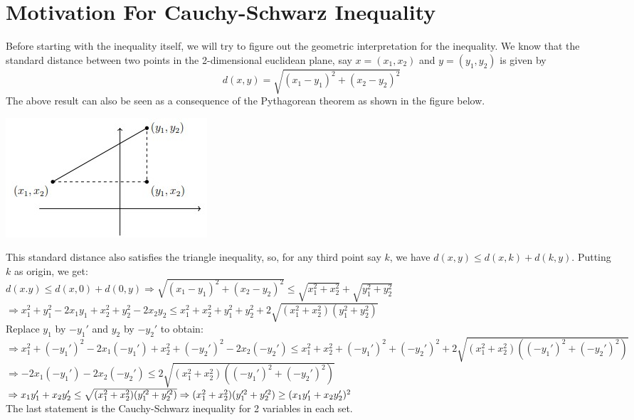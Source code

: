 \documentclass[12pt]{article}
\begin{document}
\section{Motivation For Cauchy-Schwarz Inequality}
Before starting with the inequality itself, we will try to figure out the geometric interpretation for the inequality. We know that the standard distance between two points in the 2-dimensional euclidean plane, say $x=(x_1,x_2)$ and $y=(y_1,y_2)$ is given by $$ d(x ,y)=\sqrt{(x_1-y_1)^2+(x_2-y_2)^2}$$
The above result can also be seen as a consequence of the Pythagorean theorem as shown in the figure below.
\begin{center}
    \includegraphics[]{images/zpc.jpg}
\end{center}
This standard distance also satisfies the triangle inequality, so, for any third point say $k$, we have $d(x,y)\leq d(x,k)+d(k,y)$. Putting $k$ as origin, we get: \\
$d(x.y)\leq d(x,0)+d(0,y)\Rightarrow \sqrt{(x_1-y_1)^2+(x_2-y_2)^2}\leq \sqrt{x_1^2+x_2^2}+\sqrt{y_1^2+y_2^2}$\\
$\Rightarrow x_1^2+y_1^2-2x_1y_1+x_2^2+y_2^2-2x_2y_2\leq x_1^2+x_2^2+y_1^2+y_2^2+2\sqrt{(x_1^2+x_2^2)(y_1^2+y_2^2)}$\\
Replace $y_1$ by $-y_1'$ and $y_2$ by $-y_2'$ to obtain:\\
$ \Rightarrow x_1^2+(-y_1')^2-2x_1(-y_1')+x_2^2+(-y_2')^2-2x_2(-y_2')\leq x_1^2+x_2^2+(-y_1')^2+(-y_2')^2+2\sqrt{(x_1^2+x_2^2)((-y_1')^2+(-y_2')^2)} $\\
$ \Rightarrow -2x_1(-y_1')-2x_2(-y_2')\leq 2\sqrt{(x_1^2+x_2^2)((-y_1')^2+(-y_2')^2)} $\\
$ \Rightarrow x_1y_1'+x_2y_2'\leq \sqrt{(x_1^2+x_2^2)(y_1'^2+y_2'^2)} \\ \Rightarrow (x_1^2+x_2^2)(y_1'^2+y_2'^2)\geq (x_1y_1'+x_2y_2')^2 $\\
The last statement is the Cauchy-Schwarz inequality for 2 variables in each set.
\end{document}
